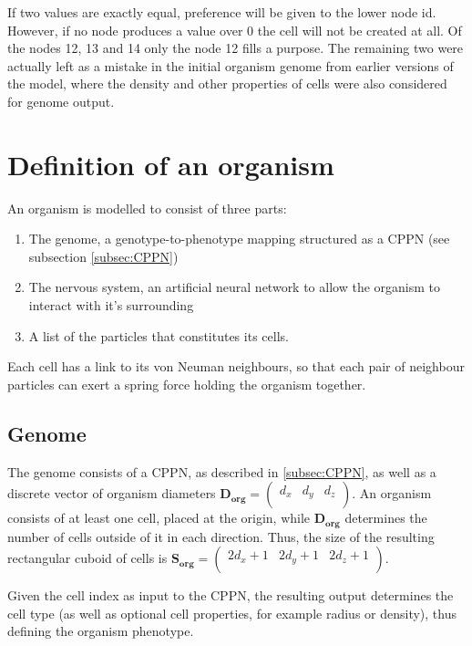 If two values are exactly equal, preference will be given to the lower node id. However, if no node produces a value over 0 the cell will not be created at all. Of the nodes 12, 13 and 14 only the node 12 fills a purpose. The remaining two were actually left as a mistake in the initial organism genome from earlier versions of the model, where the density and other properties of cells were also considered for genome output.

\section{Definition of an organism}
An organism is modelled to consist of three parts:
\begin{enumerate}
    \item The genome, a genotype-to-phenotype mapping structured as a CPPN (see subsection \ref{subsec:CPPN})
    \item The nervous system, an artificial neural network to allow the organism to interact with it's surrounding
    \item A list of the particles that constitutes its cells.
\end{enumerate}
Each cell has a link to its von Neuman neighbours, so that each pair of neighbour particles can exert a spring force holding the organism together.

\subsection{Genome}
The genome consists of a CPPN, as described in \ref{subsec:CPPN}, as well as a discrete vector of organism diameters \(\mathbf{D_{org}}=\left(\begin{array}{ccc} d_x & d_y & d_z \\\end{array}\right)\). An organism consists of at least one cell, placed at the origin, while \(\mathbf{D_{org}}\) determines the number of cells outside of it in each direction. Thus, the size of the resulting rectangular cuboid of cells is
\(\mathbf{S_{org}}=\left(\begin{array}{ccc} 2 d_x + 1 & 2 d_y + 1 & 2 d_z + 1 \\\end{array}\right)\).

Given the cell index as input to the CPPN, the resulting output determines the cell type (as well as optional cell properties, for example radius or density), thus defining the organism phenotype.

